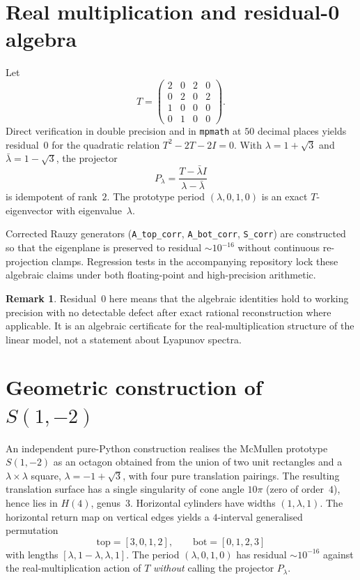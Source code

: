 \documentclass[11pt,a4paper]{article}
\theoremstyle{definition}
\newtheorem{remark}{Remark}
\begin{document}
\section{Real multiplication and residual-0 algebra}

Let
\[
T=\begin{pmatrix}2&0&2&0\\0&2&0&2\\1&0&0&0\\0&1&0&0\end{pmatrix}.
\]
Direct verification in double precision and in \texttt{mpmath} at $50$ decimal places yields residual~$0$ for the quadratic relation $T^2-2T-2I=0$.
With $\lambda=1+\sqrt{3}$ and $\bar\lambda=1-\sqrt{3}$, the projector
\[
P_\lambda=\frac{T-\bar\lambda I}{\lambda-\bar\lambda}
\]
is idempotent of rank~$2$.
The prototype period $(\lambda,0,1,0)$ is an exact $T$-eigenvector with eigenvalue~$\lambda$.

Corrected Rauzy generators (\texttt{A\_top\_corr}, \texttt{A\_bot\_corr}, \texttt{S\_corr}) are constructed so that the eigenplane is preserved to residual $\sim10^{-16}$ without continuous re-projection clamps.
Regression tests in the accompanying repository lock these algebraic claims under both floating-point and high-precision arithmetic.

\begin{remark}
Residual~$0$ here means that the algebraic identities hold to working precision with no detectable defect after exact rational reconstruction where applicable.
It is an algebraic certificate for the real-multiplication structure of the linear model, not a statement about Lyapunov spectra.
\end{remark}

\section{Geometric construction of $S(1,-2)$}

An independent pure-Python construction realises the McMullen prototype $S(1,-2)$ as an octagon obtained from the union of two unit rectangles and a $\lambda\times\lambda$ square, $\lambda=-1+\sqrt{3}$, with four pure translation pairings.
The resulting translation surface has a single singularity of cone angle $10\pi$ (zero of order~$4$), hence lies in $H(4)$, genus~$3$.
Horizontal cylinders have widths $(1,\lambda,1)$.
The horizontal return map on vertical edges yields a $4$-interval generalised permutation
\[
\mathrm{top}=[3,0,1,2],\qquad\mathrm{bot}=[0,1,2,3]
\]
with lengths $[\lambda,1-\lambda,\lambda,1]$.
The period $(\lambda,0,1,0)$ has residual $\sim10^{-16}$ against the real-multiplication action of $T$ \emph{without} calling the projector $P_\lambda$.
\end{document}
